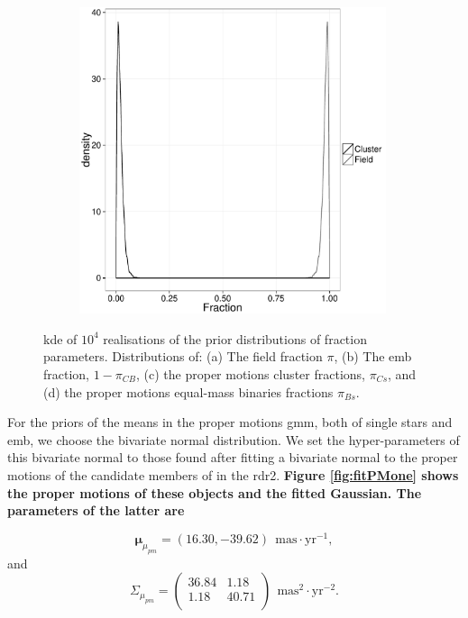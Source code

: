 \begin{figure}[ht!]
\begin{subfigure}[t]{0.48\textwidth}
        \caption{}
    \end{subfigure}
     \begin{subfigure}[t]{0.48\textwidth}
      \includegraphics[page=4,height=9cm,width=\textwidth]{background/Figures/Priors.pdf}
        \caption{}
    \end{subfigure}
\caption{\gls{kde} of $10^4$ realisations of the prior distributions of fraction parameters. Distributions of: (a) The field fraction $\pi$, (b) The \gls{emb} fraction, $1-\pi_{CB}$, (c) the proper motions cluster fractions, $\pi_{Cs}$, and (d) the proper motions equal-mass binaries fractions $\pi_{Bs}$.}
\label{figure:priors}
\end{figure}

{For the priors of the  means in the proper motions \gls{gmm}}, both of single stars and \gls{emb}, we choose the bivariate normal distribution. We set the hyper-parameters of this bivariate normal to those found after fitting a bivariate normal to the proper motions of the candidate members of \citet{Bouy2015} in the \gls{rdr2}. \textbf{Figure \ref{fig:fitPMone} shows the proper motions of these objects and the fitted Gaussian. The parameters of the latter are}

\begin{equation}
\boldsymbol{\mu}_{\mu_{pm}}=(16.30,-39.62) \ \ \mathrm{mas\cdot yr^{-1}},\nonumber
 \end{equation}
 and
 \begin{equation}
\Sigma_{\mu_{pm}} = \left( 
\begin{array}{cc}
36.84&1.18 \\
1.18&40.71\\
\end{array} \right)\ \ \mathrm{mas^2\cdot yr^{-2}}.\nonumber
\end{equation}

